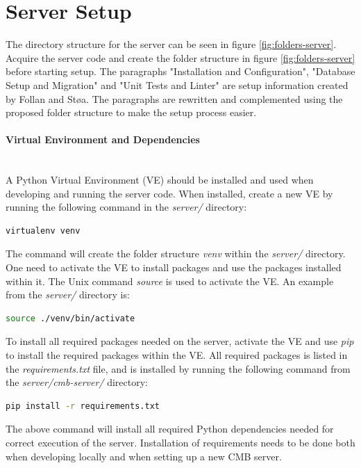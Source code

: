 \section{Server Setup}
\label{sec:ssetup}
The directory structure for the server can be seen in figure \ref{fig:folders-server}. Acquire the server code and create the folder structure in figure \ref{fig:folders-server} before starting setup. The paragraphs "Installation and Configuration", "Database Setup and Migration" and "Unit Tests and Linter" are setup information created by Follan and Støa. The paragraphs are rewritten and complemented using the proposed folder structure to make the setup process easier.

\paragraph*{Virtual Environment and Dependencies} \hfill \\
A Python Virtual Environment (VE) \cite{m:virtualenv} should be installed and used when developing and running the server code. When installed, create a new VE by running the following command in the \textit{server/} directory:
\begin{lstlisting}[language=sh]
virtualenv venv
\end{lstlisting}
The command will create the folder structure \textit{venv} within the \textit{server/} directory. One need to activate the VE to install packages and use the packages installed within it. The Unix command \textit{source} is used to activate the VE. An example from the \textit{server/} directory is:
\begin{lstlisting}[language=sh]
source ./venv/bin/activate
\end{lstlisting}

To install all required packages needed on the server, activate the VE and use \textit{pip} \cite{m:pip} to install the required packages within the VE. All required packages is listed in the \textit{requirements.txt} file, and is installed by running the following command from the \textit{server/cmb-server/} directory:
\begin{lstlisting}[language=sh]
pip install -r requirements.txt
\end{lstlisting}
The above command will install all required Python dependencies needed for correct execution of the server. Installation of requirements needs to be done both when developing locally and when setting up a new CMB server. \\

